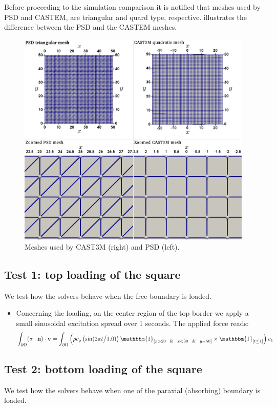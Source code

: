 \documentclass{report}
\newcommand{\bv}{\textbf{v}}
\def\bv{{\bf{v}}}
\begin{document}
Before proceeding to the simulation comparison it is notified that meshes used by PSD and CASTEM, are triangular and quard type, respective.  illustrates the difference between the PSD and the CASTEM meshes.

\begin{figure}[h]
	\centering
	\includegraphics[width=.8\textwidth]{./Images/mesh-CAST3M-PSD}
	\caption{Meshes used by CAST3M (right) and PSD (left).\label{fig:meshes} }
\end{figure}

\subsection{Test 1: top loading of the square}
We test how the solvers behave when the free boundary is loaded. 

\begin{itemize}
	\item Concerning the loading, on the center region of the top border we apply a small sinusoidal excitation spread over 1  seconds. The applied force reads:
	$$\int_{\partial \Omega} (\sigma\cdot\textbf{n})\cdot\bv  = \int_{\partial \Omega} \left(\rho c_{\text{p}}\left( \sin(2\pi t\big /1.0)\right)\mathbbm{1}_{[x>20~~\&~~x<30~~\&~~y=50  ]}\times\mathbbm{1}_{[t\le1]}\right)v_1$$
	
		 	
\end{itemize}



\subsection{Test 2: bottom loading of the square}
We test how the solvers behave when one of the paraxial (absorbing) boundary is loaded. 
\end{document}
